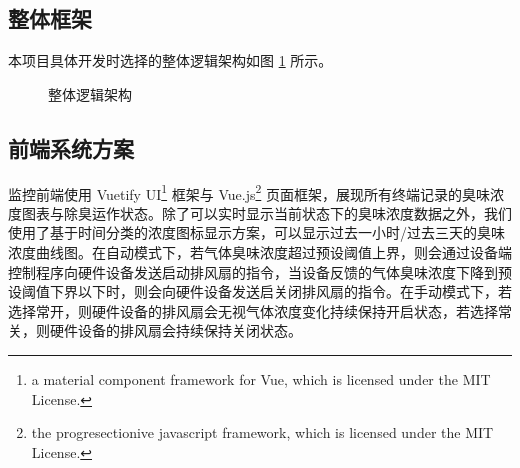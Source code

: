 \documentclass[degree=course]{sjtuthesis}
\begin{document}
\subsection{整体框架}
本项目具体开发时选择的整体逻辑架构如图 \ref{fig:diagram2} 所示。
\begin{figure}[h]
    \noindent{}
    \caption{整体逻辑架构}\label{fig:diagram2}
\end{figure}


\subsection{前端系统方案}
监控前端使用 Vuetify UI\footnote{a material component framework for Vue, which is licensed under the MIT License.} 框架与 Vue.js\footnote{the progresectionive javascript framework, which is licensed under the MIT License.} 页面框架，展现所有终端记录的臭味浓度图表与除臭运作状态。除了可以实时显示当前状态下的臭味浓度数据之外，我们使用了基于时间分类的浓度图标显示方案，可以显示过去一小时/过去三天的臭味浓度曲线图。在自动模式下，若气体臭味浓度超过预设阈值上界，则会通过设备端控制程序向硬件设备发送启动排风扇的指令，当设备反馈的气体臭味浓度下降到预设阈值下界以下时，则会向硬件设备发送启关闭排风扇的指令。在手动模式下，若选择常开，则硬件设备的排风扇会无视气体浓度变化持续保持开启状态，若选择常关，则硬件设备的排风扇会持续保持关闭状态。
\end{document}
